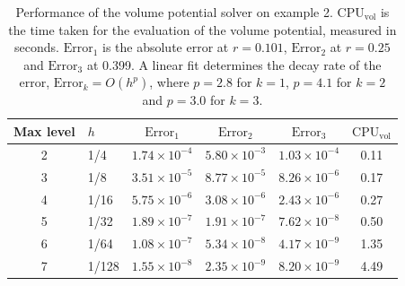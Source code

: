 \documentclass[preprint,12pt]{elsarticle}
\begin{document}
\begin{table}[h]
  \centering
  \begin{tabular*}{\textwidth}{@{\extracolsep{\fill}}clcccc}
    \hline
    Max level & $h$ & $\mbox{Error}_1$ & $\mbox{Error}_2$ & $\mbox{Error}_3$ & $\mbox{CPU}_{\mbox{vol}}$ 
    \vspace{0.05in} \\
    \hline
    2 & 1/4 & $1.74 \times 10^{-4}$ & $5.80 \times 10^{-3}$ & $1.03 \times 10^{-4}$   & 0.11 \\
    3 & 1/8 & $3.51 \times 10^{-5}$ & $8.77 \times 10^{-5}$ & $8.26 \times 10^{-6}$   & 0.17 \\
    4 & 1/16 & $5.75 \times 10^{-6}$ & $3.08 \times 10^{-6}$ & $2.43 \times 10^{-6}$ &  0.27 \\
    5 & 1/32 & $1.89 \times 10^{-7}$ & $1.91 \times 10^{-7}$ & $7.62 \times 10^{-8}$ &  0.50 \\
    6 & 1/64 & $1.08 \times 10^{-7}$ & $5.34 \times 10^{-8}$ & $4.17 \times 10^{-9}$ &  1.35 \\
    7 & 1/128 & $1.55 \times 10^{-8}$ & $2.35 \times 10^{-9}$ & $8.20 \times 10^{-9}$ &  4.49 \\
\hline
  \end{tabular*}
 \caption{Performance of the volume potential solver on example 2. $\mbox{CPU}_{\mbox{vol}}$ is the time taken for the evaluation of the volume potential, measured in seconds.  $\mbox{Error}_1$ is the absolute error at $r=0.101$, $\mbox{Error}_2$ at $r=0.25$ and $\mbox{Error}_3$ at 0.399. A linear fit determines the decay rate of the error, $\mbox{Error}_k = O(h^p)$, where $p = 2.8$ for $k=1$, $p = 4.1$ for $k=2$ and $p=3.0$ for $k=3$. 
\label{table2} }
\end{table}
\end{document}

